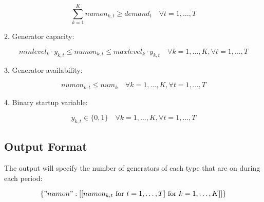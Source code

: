 \documentclass{article}
\begin{document}
\[
\sum_{k=1}^{K} numon_{k,t} \geq demand_t \quad \forall t = 1, \ldots, T
\]

2. Generator capacity:

\[
minlevel_k \cdot y_{k,t} \leq numon_{k,t} \leq maxlevel_k \cdot y_{k,t} \quad \forall k = 1, \ldots, K, \forall t = 1, \ldots, T
\]

3. Generator availability:

\[
numon_{k,t} \leq num_k \quad \forall k = 1, \ldots, K, \forall t = 1, \ldots, T
\]

4. Binary startup variable:

\[
y_{k,t} \in \{0, 1\} \quad \forall k = 1, \ldots, K, \forall t = 1, \ldots, T
\]

\subsection*{Output Format}
The output will specify the number of generators of each type that are on during each period:

\[
\{ "numon": [[numon_{k,t} \text{ for } t=1,\ldots,T] \text{ for } k=1,\ldots,K] ] \}
\]
\end{document}
